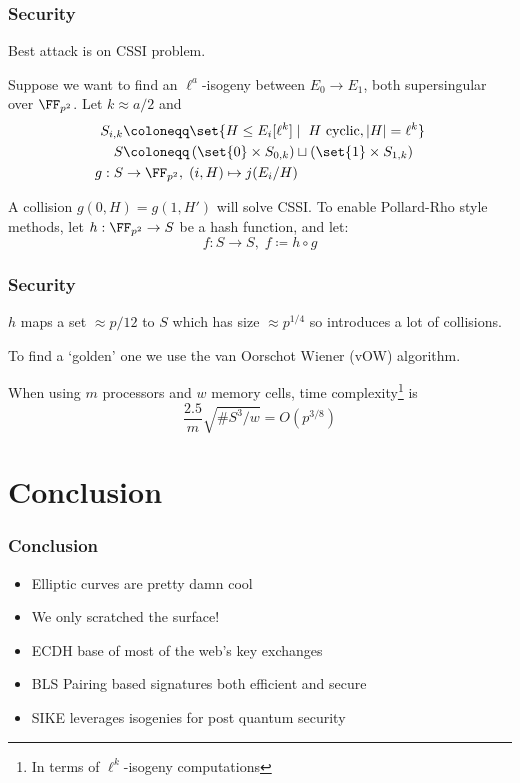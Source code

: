 \documentclass{beamer}
\begin{document}
\begin{frame}
    \frametitle{Security}
    Best attack is on CSSI problem.
     
    Suppose we want to find an $\ell^a$-isogeny  between $E_0 \to E_1$, both 
    supersingular over $\FF_{p^2}$.
     Let $k \approx a/2$ and
    \begin{align*}
        S_{i, k} &\coloneqq \set{ H \leq E_i[\ell^k] \mid \; H \text{ cyclic}, |H| = \ell^k } \\
        S &\coloneqq \left( \set{0} \times S_{0, k} \right) \sqcup \left( \set{1} \times S_{1, k} \right) \\
        g: S &\to \FF_{p^2}, \; (i, H) \mapsto j(E_{i}/H)
    \end{align*}
    
    A collision $g(0, H) = g(1, H')$ will solve CSSI.
     To enable Pollard-Rho style methods, let $h: \FF_{p^2} \to S$ 
    be a hash function, and let:
    \[ f: S \to S,\; f \coloneqq h \circ g \]
\end{frame}

\begin{frame}
    \frametitle{Security}
    $h$ maps a set $\approx p/12$ to $S$ which has size $\approx p^{1/4}$ so introduces a lot of collisions.
    
    To find a `golden' one we use the van Oorschot Wiener (vOW) algorithm. 
    
    When using $m$ processors and $w$ memory cells, time complexity\footnote{In terms of $\ell^k$-isogeny computations} is 
    \[ \frac{2.5}{m}\sqrt{\#S^3/w} = O(p^{3/8})  \]
\end{frame}

\section{Conclusion}
\begin{frame}
    \frametitle{Conclusion}
    \begin{itemize}
        \item Elliptic curves are pretty damn cool
        \item We only scratched the surface!
        \item ECDH base of most of the web's key exchanges
        \item BLS Pairing based signatures both efficient and secure
        \item SIKE leverages isogenies for post quantum security
    \end{itemize}
    

\end{frame}
\end{document}

